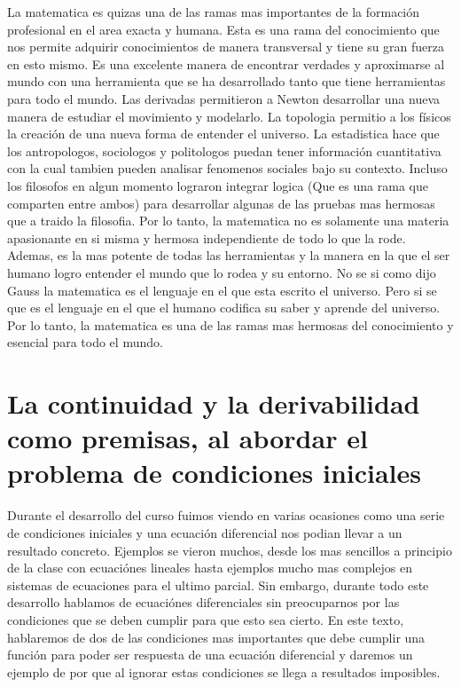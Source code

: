 \documentclass{report}
\begin{document}
La matematica es quizas una de las ramas mas importantes de la formación profesional en el area exacta y humana. Esta es una rama del conocimiento que nos permite adquirir conocimientos de manera transversal y tiene su gran fuerza en esto mismo. Es una excelente manera de encontrar verdades y aproximarse al mundo con una herramienta que se ha desarrollado tanto que tiene herramientas para todo el mundo. Las derivadas permitieron a Newton desarrollar una nueva manera de estudiar el movimiento y modelarlo. La topologia permitio a los físicos la creación de una nueva forma de entender el universo. La estadistica hace que los antropologos, sociologos y politologos puedan tener información cuantitativa con la cual tambien pueden analisar fenomenos sociales bajo su contexto. Incluso los filosofos en algun momento lograron integrar logica (Que es una rama que comparten entre ambos) para desarrollar algunas de las pruebas mas hermosas que a traido la filosofia. Por lo tanto, la matematica no es solamente una materia apasionante en si misma y hermosa independiente de todo lo que la rode. Ademas, es la mas potente de todas las herramientas y la manera en la que el ser humano logro entender el mundo que lo rodea y su entorno. No se si como dijo Gauss la matematica es el lenguaje en el que esta escrito el universo. Pero si se que es el lenguaje en el que el humano codifica su saber y aprende del universo. Por lo tanto, la matematica es una de las ramas mas hermosas del conocimiento y esencial para todo el mundo.

\chapter{La continuidad y la derivabilidad como premisas, al abordar el problema de condiciones iniciales}

Durante el desarrollo del curso fuimos viendo en varias ocasiones como una serie de condiciones iniciales y una ecuación diferencial nos podian llevar a un resultado concreto. Ejemplos se vieron muchos, desde los mas sencillos a principio de la clase con ecuaciónes lineales hasta ejemplos mucho mas complejos en sistemas de ecuaciones para el ultimo parcial. Sin embargo, durante todo este desarrollo hablamos de ecuaciónes diferenciales sin preocuparnos por las condiciones que se deben cumplir para que esto sea cierto. En este texto, hablaremos de dos de las condiciones mas importantes que debe cumplir una función para poder ser respuesta de una ecuación diferencial y daremos un ejemplo de por que al ignorar estas condiciones se llega a resultados imposibles.
\end{document}
